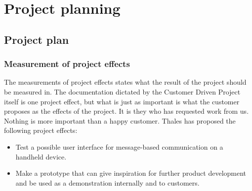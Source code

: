 \chapter{Project planning}

\section{Project plan}

\subsection{Measurement of project effects}
The measurements of project effects states what the result of the project should be measured in. The documentation dictated by the Customer Driven Project itself is one project effect, but what is just as important is what the customer proposes as the effects of the project. It is they who has requested work from us. Nothing is more important than a happy customer.
\newline
\newline
Thales has proposed the following project effects:
\begin{itemize}
\item{}Test a possible user interface for message-based communication on a handheld device.
\item{}Make a prototype that can give inspiration for further product development and be used as a demonstration internally and to customers.
\end{itemize}